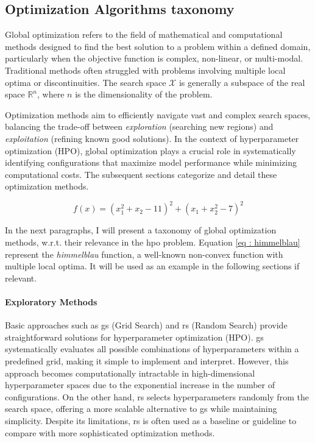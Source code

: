 \subsection{Optimization Algorithms taxonomy}
\label{sec : opt_algo}


Global optimization refers to the field of mathematical and computational methods designed to find the best solution to a problem within a defined domain, particularly when the objective function is complex, non-linear, or multi-modal. Traditional methods often struggled with problems involving multiple local optima or discontinuities. The search space $\mathcal X$ is generally a subspace of the real space $\mathbb{R}^n$, where $n$ is the dimensionality of the problem.

Optimization methods aim to efficiently navigate vast and complex search spaces, balancing the trade-off between \textit{exploration} (searching new regions) and \textit{exploitation} (refining known good solutions). In the context of hyperparameter optimization (HPO), global optimization plays a crucial role in systematically identifying configurations that maximize model performance while minimizing computational costs. The subsequent sections categorize and detail these optimization methods. 

\begin{equation}
    f(x) = (x_1^2 + x_2 - 11)^2 + (x_1 + x_2^2 - 7)^2
    \label{eq : himmelblau}
\end{equation}

In the next paragraphs, I will present a taxonomy of global optimization methods, w.r.t. their relevance in the \acrshort{hpo} problem. Equation \ref{eq : himmelblau} represent the \textit{himmelblau} function, a well-known non-convex function with multiple local optima. It will be used as an example in the following sections if relevant. 




\paragraph{Exploratory Methods} 
Basic approaches such as \acrfull{gs} (Grid Search) and \acrfull{rs} (Random Search) provide straightforward solutions for hyperparameter optimization (HPO). \acrshort{gs} systematically evaluates all possible combinations of hyperparameters within a predefined grid, making it simple to implement and interpret. However, this approach becomes computationally intractable in high-dimensional hyperparameter spaces due to the exponential increase in the number of configurations. On the other hand, \acrshort{rs} selects hyperparameters randomly from the search space, offering a more scalable alternative to \acrshort{gs} while maintaining simplicity. Despite its limitations, \acrshort{rs} is often used as a baseline or guideline to compare with more sophisticated optimization methods.


